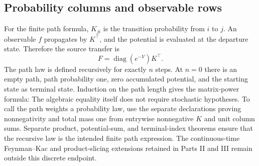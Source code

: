 \subsection{Probability columns and observable rows}
For the finite path formula, $K_{ji}$ is the transition probability from $i$ to $j$. An observable $f$ propagates by $K^\top$, and the potential is evaluated at the departure state. Therefore the source transfer is
\[
F=\operatorname{diag}(e^{-V})K^\top.
\]
The path law is defined recursively for exactly $n$ steps. At $n=0$ there is an empty path, path probability one, zero accumulated potential, and the starting state as terminal state. Induction on the path length gives the matrix-power formula:
The algebraic equality itself does not require stochastic hypotheses. To call the path weights a probability law, use the separate declarations proving nonnegativity and total mass one from entrywise nonnegative $K$ and unit column sums. Separate product, potential-sum, and terminal-index theorems ensure that the recursive law is the intended finite path expression. The continuous-time Feynman--Kac and product-slicing extensions retained in Parts II and III remain outside this discrete endpoint.
